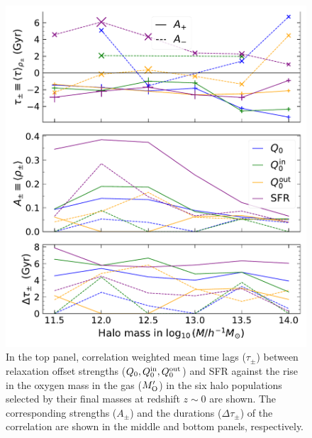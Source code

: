 \begin{figure}[htbp]
\centering
\includegraphics[width=.69\linewidth]{plots/dynam_relxn/shift_betw_multi-dM(O)_FoF_fullcorr.pdf}
\caption{In the top panel, correlation weighted mean time lags ($\tau_{\pm}$) between relaxation offset strengths ($Q_0, Q_0^{\rm{in}}, Q_0^{\rm{out}}$) and SFR against the rise in the oxygen mass in the gas ($M_{\rm{O}}'$) in the six halo populations selected by their final masses at redshift $z\sim 0$ are shown. The corresponding strengths ($A_{\pm}$) and the durations ($\Delta \tau_{\pm}$) of the correlation are shown in the middle and bottom panels, respectively.} 
\label{fig:dynam-correl-q0-dMOFoF-timeshift-func}
\end{figure}




